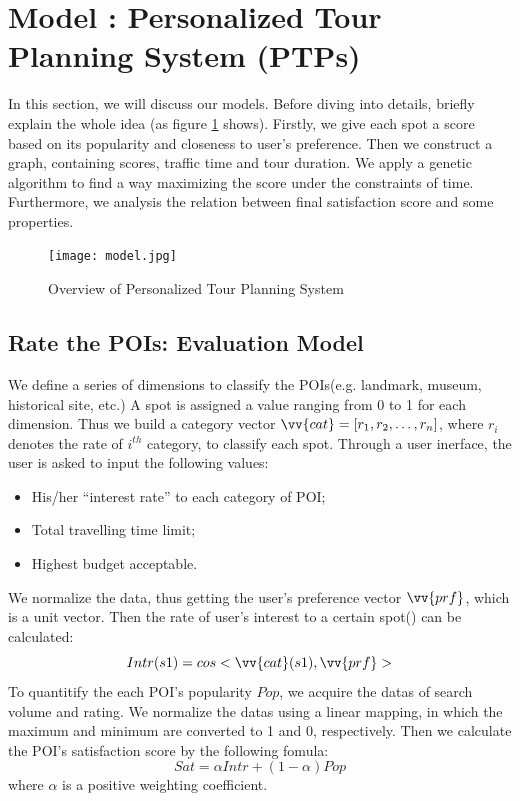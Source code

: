 \documentclass{mcmthesis}
\newcommand{\RNum}[1]{\uppercase\expandafter{\romannumeral #1\relax}}
\begin{document}
\section{Model \RNum{1}: Personalized Tour Planning System (PTPs)} \label{section:model1}
  In this section, we will discuss our models. Before diving into details, briefly explain the whole idea (as figure \ref{fig:model} shows). Firstly, we give each spot a score based on its popularity and closeness to user's preference. Then we construct a graph, containing scores, traffic time and tour duration. We apply a genetic algorithm to find a way maximizing the score under the constraints of time. Furthermore, we analysis the relation between final satisfaction score and some properties.
  \begin{figure}[ht]
    \centering
    \texttt{[image: model.jpg]}
    \caption{Overview of Personalized Tour Planning System}
    \label{fig:model}
  \end{figure}
\subsection{Rate the POIs: Evaluation Model}
  We define a series of dimensions to classify the POIs(e.g. landmark, museum, historical site, etc.) A spot is assigned a value ranging from 0 to 1 for each dimension. Thus we build a category vector $\vv{cat} = [r_{1}, r_{2}, \ldots, r_{n}]$, where $r_{i}$ denotes the rate of $i^{th}$ category, to classify each spot. Through a user inerface, the user is asked to input the following values:
  \begin{itemize}
    \item His/her ``interest rate'' to each category of POI;
    \item Total travelling time limit;
    \item Highest budget acceptable.
  \end{itemize}
  We normalize the data, thus getting the user's preference vector $\vv{prf}$, which is a unit vector. Then the rate of user's interest to a certain spot() can be calculated: 
  \[
    Intr(s1) = cos<\vv{cat}(s1),\vv{prf}>
  \]
  To quantitify the each POI's popularity $Pop$, we acquire the datas of search volume and rating. We normalize the datas using a linear mapping, in which the maximum and minimum are converted to 1 and 0, respectively. Then we calculate the POI's satisfaction score by the following fomula:
  \[
    Sat = \alpha Intr + (1-\alpha)Pop
  \]
  where $\alpha$ is a positive weighting coefficient.
\end{document}

